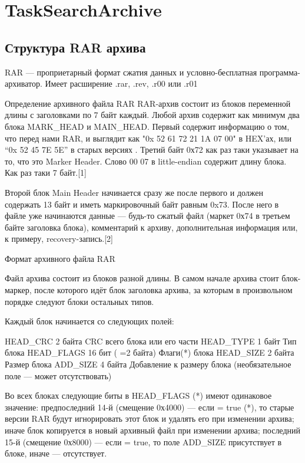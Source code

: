\section{TaskSearchArchive}

\subsection{Структура RAR архива}
RAR — проприетарный формат сжатия данных и условно-бесплатная программа-архиватор. Имеет расширение .rar, .rev, .r00 или .r01

Определение архивного файла RAR
RAR-архив состоит из блоков переменной длины с заголовками по 7 байт каждый. Любой архив содержит как минимум два блока MARK_HEAD и MAIN_HEAD. Первый содержит информацию о том, что перед нами RAR, и выглядит как "0x 52 61 72 21 1A 07 00" в HEX'ах, или “0x 52 45 7E 5E” в старых версиях . Третий байт 0х72 как раз таки указывает на то, что это Marker Header. Слово 00 07 в little-endian содержит длину блока. Как раз таки 7 байт.[1]

Второй блок Main Header начинается сразу же после первого и должен содержать 13 байт и иметь маркировочный байт равным 0x73. После него в файле уже начинаются данные — будь-то сжатый файл (маркет 0х74 в третьем байте заголовка блока), комментарий к архиву, дополнительная информация или, к примеру, recovery-запись.[2]

Формат архивного файла RAR
                
Файл архива состоит из блоков разной длины.
В самом начале архива стоит блок-маркер, после которого идёт блок заголовка архива, за которым в произвольном порядке следуют блоки остальных типов.
                
                Каждый блок начинается со следующих полей:         
                 
HEAD_CRC 
2 байта 
CRC всего блока или его части
HEAD_TYPE 
1 байт
Тип блока 
HEAD_FLAGS
16 бит ( =2 байта) 
Флаги(*) блока     
HEAD_SIZE     
2 байта
Размер блока 
ADD_SIZE
4 байта 
Добавление к размеру блока (необязательное поле — может отсутствовать) 
            
Во всех блоках следующие биты в HEAD_FLAGS (*) имеют одинаковое значение:         
предпоследний 14-й (смещение 0х4000) — если = true (*), то старые версии RAR будут игнорировать этот блок и удалять его при изменении архива; иначе блок копируется в новый архивный файл при изменении архива;
последний 15-й (смещение 0х8000) — если = true, то поле ADD_SIZE присутствует в блоке, иначе — отсутствует.
                
